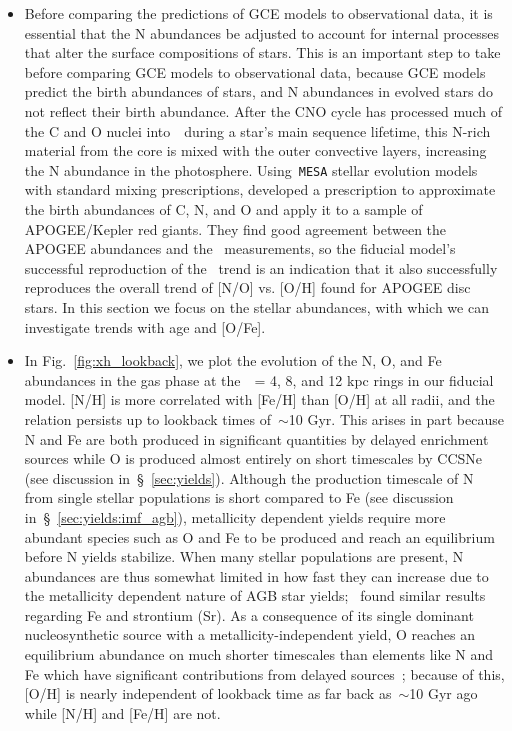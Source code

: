 \documentclass[ms.tex]{subfiles}
\begin{document}
\begin{itemize} 
	\item Before comparing the predictions of GCE models to observational data, 
	it is essential that the N abundances be adjusted to account for internal 
	processes that alter the surface compositions of stars. 
	This is an important step to take before comparing GCE models to 
	observational data, because GCE models predict the birth abundances of 
	stars, and N abundances in evolved stars do not reflect their birth 
	abundance. 
	After the CNO cycle has processed much of the C and O nuclei 
	into~\Nfourteen~during a star's main sequence lifetime, this N-rich 
	material from the core is mixed with the outer convective layers, 
	increasing the N abundance in the photosphere. 
	Using~\texttt{MESA} stellar evolution models~\citep{Paxton2011, Paxton2013, 
	Paxton2015, Paxton2018} with standard mixing prescriptions, 
	\citet{Vincenzo2021} developed a prescription to approximate the birth 
	abundances of C, N, and O and apply it to a sample of APOGEE/Kepler red 
	giants. 
	They find good agreement between the APOGEE abundances and 
	the~\citet{Dopita2016} measurements, so the fiducial model's successful 
	reproduction of the~\citet{Dopita2016} trend is an indication that it also 
	successfully reproduces the overall trend of [N/O] vs. [O/H] found for 
	APOGEE disc stars. 
	In this section we focus on the stellar abundances, with which we can 
	investigate trends with age and [O/Fe]. 

	\item In Fig.~\ref{fig:xh_lookback}, we plot the evolution of the N, O, and 
	Fe abundances in the gas phase at the~\rgal~= 4, 8, and 12 kpc rings in our 
	fiducial model. 
	[N/H] is more correlated with [Fe/H] than [O/H] at all radii, and the 
	relation persists up to lookback times of~$\sim$10 Gyr. 
	This arises in part because N and Fe are both produced in significant 
	quantities by delayed enrichment sources while O is produced almost 
	entirely on short timescales by CCSNe (see discussion 
	in~\S~\ref{sec:yields}). 
	Although the production timescale of N from single stellar populations is 
	short compared to Fe (see discussion in~\S~\ref{sec:yields:imf_agb}), 
	metallicity dependent yields require more abundant species such as O and Fe 
	to be produced and reach an equilibrium before N yields stabilize. 
	When many stellar populations are present, N abundances are thus somewhat 
	limited in how fast they can increase due to the metallicity dependent 
	nature of AGB star yields;~\citet{Johnson2020} found similar results 
	regarding Fe and strontium (Sr). 
	As a consequence of its single dominant nucleosynthetic source with a 
	metallicity-independent yield, O reaches an equilibrium abundance on much 
	shorter timescales than elements like N and Fe which have significant 
	contributions from delayed sources~\citep{Weinberg2017}; because of this, 
	[O/H] is nearly independent of lookback time as far back as~$\sim$10 Gyr 
	ago while [N/H] and [Fe/H] are not. 


\end{itemize}
\end{document}
